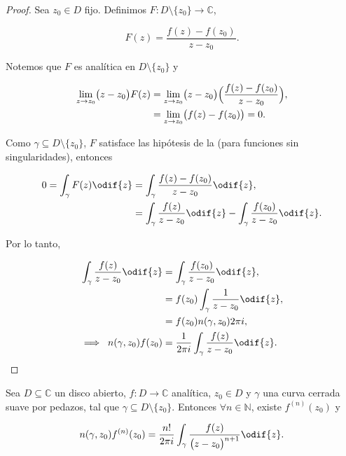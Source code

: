 \documentclass[../main.tex]{subfiles}
\begin{document}
\begin{proof}
    Sea \(z_{0}\in  D\) fijo. Definimos \(F \colon D\setminus \{z_{0}\} \to
    \mathbb{C}\),

    \begin{equation*}
        F(z) = \dfrac{f(z) - f(z_{0})}{z - z_{0}}.
    \end{equation*}

    Notemos que \(F\) es analítica en \(D\setminus \{z_{0}\}\) y

    \begin{align*}
        \lim_{z \to z_{0}} \bigl(z - z_{0}\bigr)F(z) &= \lim_{z \to z_{0}} \bigl(z -
        z_{0}\bigr)\Bigl(\dfrac{f(z) - f(z_{0})}{z - z_{0}}\Bigr),\\
        &= \lim_{z \to z_{0}} \bigl(f(z) - f(z_{0})\bigr) = 0.
    \end{align*}

    Como \(\gamma \subseteq D\setminus \{z_{0}\}\), \(F\) satisface las hipótesis de la
    (para funciones sin singularidades), entonces

    \begin{align*}
        0 = \int_{\gamma}^{}F(z)\odif{z} &= \int_{\gamma}^{}\dfrac{f(z) - f(z_{0})}{z -
        z_{0}}\odif{z},\\
        &= \int_{\gamma}^{}\dfrac{f(z)}{z - z_{0}}\odif{z} -
        \int_{\gamma}^{}\dfrac{f(z_{0})}{z - z_{0}}\odif{z}.
    \end{align*}

    Por lo tanto,

    \begin{align*}
        \int_{\gamma}^{}\dfrac{f(z)}{z - z_{0}}\odif{z} &=
        \int_{\gamma}^{}\dfrac{f(z_{0})}{z
        - z_{0}}\odif{z},\\
        &= f(z_{0}) \int_{\gamma}^{}\dfrac{1}{z - z_{0}}\odif{z},\\
        &= f(z_{0})n(\gamma, z_{0})2\pi i,\\
        \implies\; n(\gamma, z_{0})f(z_{0}) &= \dfrac{1}{2\pi
        i}\int_{\gamma}^{}\dfrac{f(z)}{z -
        z_{0}}\odif{z}.
    \end{align*}
\end{proof}

\begin{proposition}\label{proposition:integralCauchyGral}
    Sea \(D \subseteq \mathbb{C}\) un disco abierto, \(f \colon D \to \mathbb{C}\)
    analítica,  \(z_{0}\in  D\) y \(\gamma\) una curva cerrada suave por pedazos, tal
    que \(\gamma \subseteq D\setminus \{z_{0}\}\). Entonces \(\forall n\in \mathbb{N}\),
    existe \(f^{(n)}(z_{0})\) y

    \begin{equation*}
        n(\gamma, z_{0})f^{(n)}(z_{0}) = \dfrac{n!}{2\pi
        i}\int_{\gamma}^{}\dfrac{f(z)}{\bigl(z - z_{0}\bigr)^{n + 1}}\odif{z}.
    \end{equation*}
\end{proposition}
\end{document}
